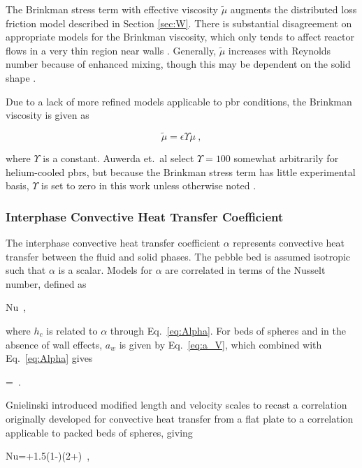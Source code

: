 The Brinkman stress term with effective viscosity \(\tilde{\mu}\) augments the distributed loss friction model described in Section \ref{sec:W}. There is substantial disagreement on appropriate models for the Brinkman viscosity, which only tends to affect reactor flows in a very thin region near walls \cite{auwerda_2011,giese,vafai,tecdoc1163}. Generally, \(\tilde{\mu}\) increases with Reynolds number because of enhanced mixing, though this may be dependent on the solid shape \cite{giese}. 

Due to a lack of more refined models applicable to \gls{pbr} conditions, the Brinkman viscosity is given as

\begin{equation}
\label{eq:MultiplierEffectiveViscosity}
\tilde{\mu}=\epsilon\Upsilon\mu\ ,
\end{equation}

\noindent where \(\Upsilon\) is a constant. Auwerda et.\ al select \(\Upsilon=100\) somewhat arbitrarily for helium-cooled \glspl{pbr}, but because the Brinkman stress term has little experimental basis, \(\Upsilon\) is set to zero in this work unless otherwise noted \cite{auwerda_2011}.

\subsubsection{Interphase Convective Heat Transfer Coefficient}
\label{sec:alpha}

The interphase convective heat transfer coefficient \(\alpha\) represents convective heat transfer between the fluid and solid phases. The pebble bed is assumed isotropic such that \(\alpha\) is a scalar. Models for \(\alpha\) are correlated in terms of the Nusselt number, defined as

\beq
\label{eq:NuDef}
Nu\equiv{}\ ,
\eeq

\noindent where \(h_c\) is related to \(\alpha\) through Eq.\ \eqref{eq:Alpha}. For beds of spheres and in the absence of wall effects, \(a_w\) is given by Eq.\ \eqref{eq:a_V}, which combined with Eq.\ \eqref{eq:Alpha} gives

\beq
\alpha=\ .
\eeq

\noindent Gnielinski introduced modified length and velocity scales to recast a correlation originally developed for convective heat transfer from a flat plate to a correlation applicable to packed beds of spheres, giving

\beq
\label{eq:GnielinskiPebblebed}
Nu=\left{}+1.5(1-\epsilon)\right\rbrack\left(2+\right)\ ,
\eeq

